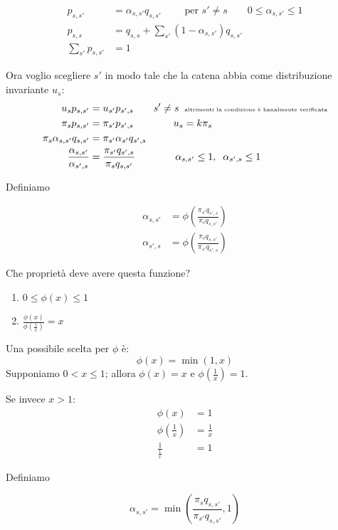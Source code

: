 \documentclass[a4paper,12pt]{book}
\newcommand\ddfrac[2]{\frac{\displaystyle #1}{\displaystyle #2}}
\begin{document}
\begin{align*}
	 p_{s,s'} & = \alpha_{s,s'}q_{s,s'} \qquad \text{ per } s' \ne s \qquad 0 \le \alpha_{s,s'} \le 1 \\
	 p_{s,s} & = q_{s,s} + \sum_{s'}(1 - \alpha_{s,s'})q_{s,s'} \\
	 \sum_{s'}p_{s,s'} & = 1
\end{align*}

Ora voglio scegliere $ s' $ in modo tale che la catena abbia come distribuzione invariante $ u_s $:
\begin{align*}
	u_s p_{s,s'} & = u_{s'}p_{s',s} \qquad s' \ne s \; \; \text{\tiny altrimenti la condizione è banalmente verificata} \\
	\pi_s p_{s,s'} & = \pi_{s'}p_{s',s} \qquad \qquad u_s = k\pi_s \\
	\pi_s \alpha_{s,s'}q_{s,s'} & = \pi_{s'}\alpha_{s'}q_{s',s} \\		
	\ddfrac{\alpha_{s,s'}}{\alpha_{s',s}} & = \ddfrac{\pi_{s'}q_{s',s}}{\pi_s q_{s,s'}} \qquad \qquad \alpha_{s,s'} \le 1 , \; \;  \alpha_{s',s} \le 1
\end{align*}

Definiamo

\begin{align*}
	\alpha_{s,s'} & = \phi \left(\ddfrac{\pi_{s'} q_{s',s}}{\pi_s q_{s,s'}}\right) \\
	\alpha_{s',s} & = \phi \left(\ddfrac{\pi_{s} q_{s,s'}}{\pi_{s'} q_{s',s}}\right) 
\end{align*}

Che proprietà deve avere questa funzione?

\begin{enumerate}
	\item $ 0 \le \phi(x) \le 1 $
	\item $ \ddfrac{\phi(x)}{\phi\left(\frac{1}{x}\right)} = x $
\end{enumerate}

Una possibile scelta per $\phi$ è:
$$ \phi(x) = \min(1,x) $$
Supponiamo $ 0 < x \le 1 $; allora $ \phi(x) = x $ e $ \phi(\frac{1}{x}) = 1 $.

Se invece $ x > 1 $: 
\begin{align*}
	\phi(x) & = 1 \\
	\phi(\frac{1}{x}) & = \frac{1}{x} \\
	\frac{1}{\frac{1}{x}} & = 1
\end{align*}

Definiamo

$$ \alpha_{s,s'} = \min\left(\ddfrac{\pi_s q_{s,s'}}{\pi_{s'}q_{s,s'}}, 1\right)$$ %
\end{document}
